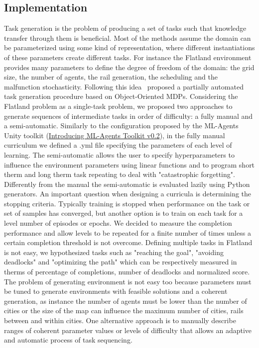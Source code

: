 \documentclass[11pt, a4paper, hidelinks]{report}
\begin{document}
\subsection{Implementation}\label{subsec:implementation3}

Task generation is the problem of producing a set of tasks such that knowledge transfer through them is beneficial.
Most of the methods assume the domain can be parameterized using some kind of representation, where different instantiations of these parameters create different tasks.
For instance the Flatland environment provides many parameters to define the degree of freedom of the domain: the grid size, the number of agents, the rail generation, the scheduling and the malfunction stochasticity.
Following this idea~\citep{object-oriented-mdp} proposed a partially automated task generation procedure based on Object-Oriented MDPs.
Considering the Flatland problem as a single-task problem, we proposed two approaches to generate sequences of intermediate tasks in order of difficulty: a fully manual and a semi-automatic.
Similarly to the configuration proposed by the ML-Agents Unity toolkit (\href{https://blogs.unity3d.com/2017/12/08/introducing-ml-agents-v0-2-curriculum-learning-new-environments-and-more}{Introducing ML-Agents Toolkit v0.2}), in the fully manual curriculum we defined a .yml file specifying the parameters of each level of learning.
The semi-automatic allows the user to specify hyperparameters to influence the environment parameters using linear functions and to program short therm and long therm task repeating to deal with "catastrophic forgetting".
Differently from the manual the semi-automatic is evaluated lazily using Python generators.
An important question when designing a curricula is determining the stopping criteria.
Typically training is stopped when performance on the task or set of samples has converged, but another option is to train on each task for a level number of episodes or epochs.
We decided to measure the completion performance and allow levels to be repeated for a finite number of times unless a certain completion threshold is not overcome.
Defining multiple tasks in Flatland is not easy, we hypothesized tasks such as "reaching the goal", "avoiding deadlocks" and "optimizing the path" which can be respectively measured in therms of percentage of completions, number of deadlocks and normalized score.
The problem of generating environment is not easy too because parameters must be tuned to generate environments with feasible solutions and a coherent generation, as instance the number of agents must be lower than the number of cities or the size of the map can influence the maximum number of cities, rails between and within cities.
One alternative approach is to manually describe ranges of coherent parameter values or levels of difficulty that allows an adaptive and automatic process of task sequencing.
\end{document}
